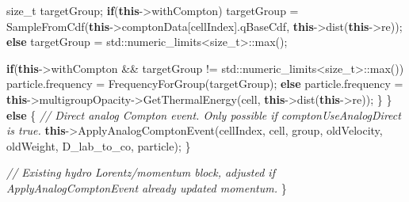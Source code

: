 \documentclass[
]{article}
\newenvironment{Shaded}{}{}
\newcommand{\BuiltInTok}[1]{\textcolor[rgb]{0.00,0.50,0.00}{#1}}
\newcommand{\CommentTok}[1]{\textcolor[rgb]{0.38,0.63,0.69}{\textit{#1}}}
\newcommand{\ControlFlowTok}[1]{\textcolor[rgb]{0.00,0.44,0.13}{\textbf{#1}}}
\newcommand{\DataTypeTok}[1]{\textcolor[rgb]{0.56,0.13,0.00}{#1}}
\newcommand{\KeywordTok}[1]{\textcolor[rgb]{0.00,0.44,0.13}{\textbf{#1}}}
\newcommand{\NormalTok}[1]{#1}
\newcommand{\OperatorTok}[1]{\textcolor[rgb]{0.40,0.40,0.40}{#1}}
\begin{document}
\begin{Shaded}
\begin{Highlighting}[]
            \DataTypeTok{size\_t}\NormalTok{ targetGroup}\OperatorTok{;}
            \ControlFlowTok{if}\OperatorTok{(}\KeywordTok{this}\OperatorTok{{-}\textgreater{}}\NormalTok{withCompton}\OperatorTok{)}
\NormalTok{                targetGroup }\OperatorTok{=}\NormalTok{ SampleFromCdf}\OperatorTok{(}\KeywordTok{this}\OperatorTok{{-}\textgreater{}}\NormalTok{comptonData}\OperatorTok{[}\NormalTok{cellIndex}\OperatorTok{].}\NormalTok{qBaseCdf}\OperatorTok{,} \KeywordTok{this}\OperatorTok{{-}\textgreater{}}\NormalTok{dist}\OperatorTok{(}\KeywordTok{this}\OperatorTok{{-}\textgreater{}}\NormalTok{re}\OperatorTok{));}
            \ControlFlowTok{else}
\NormalTok{                targetGroup }\OperatorTok{=} \BuiltInTok{std::}\NormalTok{numeric\_limits}\OperatorTok{\textless{}}\DataTypeTok{size\_t}\OperatorTok{\textgreater{}::}\NormalTok{max}\OperatorTok{();}

            \ControlFlowTok{if}\OperatorTok{(}\KeywordTok{this}\OperatorTok{{-}\textgreater{}}\NormalTok{withCompton }\OperatorTok{\&\&}\NormalTok{ targetGroup }\OperatorTok{!=} \BuiltInTok{std::}\NormalTok{numeric\_limits}\OperatorTok{\textless{}}\DataTypeTok{size\_t}\OperatorTok{\textgreater{}::}\NormalTok{max}\OperatorTok{())}
\NormalTok{                particle}\OperatorTok{.}\NormalTok{frequency }\OperatorTok{=}\NormalTok{ FrequencyForGroup}\OperatorTok{(}\NormalTok{targetGroup}\OperatorTok{);}
            \ControlFlowTok{else}
\NormalTok{                particle}\OperatorTok{.}\NormalTok{frequency }\OperatorTok{=} \KeywordTok{this}\OperatorTok{{-}\textgreater{}}\NormalTok{multigroupOpacity}\OperatorTok{{-}\textgreater{}}\NormalTok{GetThermalEnergy}\OperatorTok{(}\NormalTok{cell}\OperatorTok{,} \KeywordTok{this}\OperatorTok{{-}\textgreater{}}\NormalTok{dist}\OperatorTok{(}\KeywordTok{this}\OperatorTok{{-}\textgreater{}}\NormalTok{re}\OperatorTok{));}
        \OperatorTok{\}}
    \OperatorTok{\}}
    \ControlFlowTok{else}
    \OperatorTok{\{}
        \CommentTok{// Direct analog Compton event. Only possible if comptonUseAnalogDirect is true.}
        \KeywordTok{this}\OperatorTok{{-}\textgreater{}}\NormalTok{ApplyAnalogComptonEvent}\OperatorTok{(}\NormalTok{cellIndex}\OperatorTok{,}\NormalTok{ cell}\OperatorTok{,}\NormalTok{ group}\OperatorTok{,}\NormalTok{ oldVelocity}\OperatorTok{,}\NormalTok{ oldWeight}\OperatorTok{,}\NormalTok{ D\_lab\_to\_co}\OperatorTok{,}\NormalTok{ particle}\OperatorTok{);}
    \OperatorTok{\}}

    \CommentTok{// Existing hydro Lorentz/momentum block, adjusted if ApplyAnalogComptonEvent already updated momentum.}
\OperatorTok{\}}
\end{Highlighting}
\end{Shaded}
\end{document}

